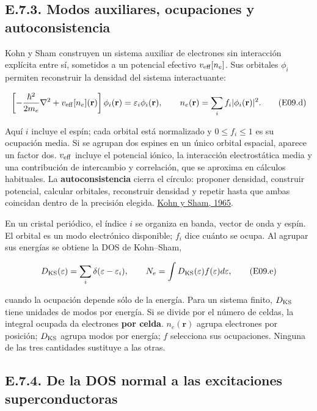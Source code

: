 \documentclass[
  spanish,
  10pt,
  a4paper,
]{article}
\begin{document}
\subsection{E.7.3. Modos auxiliares, ocupaciones y
autoconsistencia}\label{e.7.3.-modos-auxiliares-ocupaciones-y-autoconsistencia}

Kohn y Sham construyen un sistema auxiliar de electrones sin interacción
explícita entre sí, sometidos a un potencial efectivo
\(v_{\rm eff}[n_e]\). Sus orbitales \(\phi_i\) permiten reconstruir la
densidad del sistema interactuante:

\[
\left[-\frac{\hbar^2}{2m_e}\nabla^2+v_{\rm eff}[n_e](\mathbf r)\right]\phi_i(\mathbf r)
=\varepsilon_i\phi_i(\mathbf r),
\qquad n_e(\mathbf r)=\sum_i f_i|\phi_i(\mathbf r)|^2.
\tag{E09.d}
\]

Aquí \(i\) incluye el espín; cada orbital está normalizado y
\(0\le f_i\le1\) es su ocupación media. Si se agrupan dos espines en un
único orbital espacial, aparece un factor dos. \(v_{\rm eff}\) incluye
el potencial iónico, la interacción electrostática media y una
contribución de intercambio y correlación, que se aproxima en cálculos
habituales. La \textbf{autoconsistencia} cierra el círculo: proponer
densidad, construir potencial, calcular orbitales, reconstruir densidad
y repetir hasta que ambas coincidan dentro de la precisión elegida.
\href{https://hj.hi.is/masterscourse/KohnSham65.pdf}{Kohn y Sham, 1965}.

En un cristal periódico, el índice \(i\) se organiza en banda, vector de
onda y espín. El orbital es un modo electrónico disponible; \(f_i\) dice
cuánto se ocupa. Al agrupar sus energías se obtiene la DOS de
Kohn--Sham,

\[
D_{\rm KS}(\varepsilon)=\sum_i\delta(\varepsilon-\varepsilon_i),
\qquad N_e=\int D_{\rm KS}(\varepsilon)f(\varepsilon)d\varepsilon,
\tag{E09.e}
\]

cuando la ocupación depende sólo de la energía. Para un sistema finito,
\(D_{\rm KS}\) tiene unidades de modos por energía. Si se divide por el
número de celdas, la integral ocupada da electrones \textbf{por celda}.
\(n_e(\mathbf r)\) agrupa electrones por posición; \(D_{\rm KS}\) agrupa
modos por energía; \(f\) selecciona sus ocupaciones. Ninguna de las tres
cantidades sustituye a las otras.

\subsection{E.7.4. De la DOS normal a las excitaciones
superconductoras}\label{e.7.4.-de-la-dos-normal-a-las-excitaciones-superconductoras}
\end{document}
